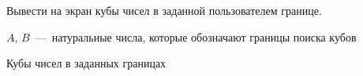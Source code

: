 Вывести на экран кубы чисел в заданной пользователем границе.

\InputFile

$A$, $B$~---~натуральные числа, которые обозначают границы поиска кубов

\OutputFile

Кубы чисел в заданных границах

\SAMPLES

